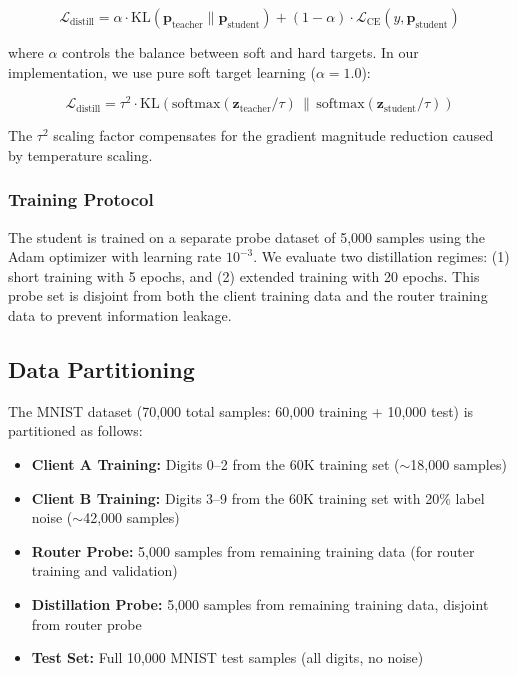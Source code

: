 \documentclass[12pt]{article}
\begin{document}
\begin{equation}
\mathcal{L}_{\text{distill}} = \alpha \cdot \text{KL}(\mathbf{p}_{\text{teacher}} \| \mathbf{p}_{\text{student}}) + (1-\alpha) \cdot \mathcal{L}_{\text{CE}}(y, \mathbf{p}_{\text{student}})
\end{equation}

where $\alpha$ controls the balance between soft and hard targets. In our implementation, we use pure soft target learning ($\alpha=1.0$):

\begin{equation}
\mathcal{L}_{\text{distill}} = \tau^2 \cdot \text{KL}\left(\text{softmax}(\mathbf{z}_{\text{teacher}}/\tau) \,\|\, \text{softmax}(\mathbf{z}_{\text{student}}/\tau)\right)
\end{equation}

The $\tau^2$ scaling factor compensates for the gradient magnitude reduction caused by temperature scaling.

\subsubsection{Training Protocol}

The student is trained on a separate probe dataset of 5,000 samples using the Adam optimizer with learning rate $10^{-3}$. We evaluate two distillation regimes: (1) short training with 5 epochs, and (2) extended training with 20 epochs. This probe set is disjoint from both the client training data and the router training data to prevent information leakage.

\subsection{Data Partitioning}
\label{subsec:data_partitioning}

The MNIST dataset (70,000 total samples: 60,000 training + 10,000 test) is partitioned as follows:

\begin{itemize}
    \item \textbf{Client A Training:} Digits 0--2 from the 60K training set ($\sim$18,000 samples)
    \item \textbf{Client B Training:} Digits 3--9 from the 60K training set with 20\% label noise ($\sim$42,000 samples)
    \item \textbf{Router Probe:} 5,000 samples from remaining training data (for router training and validation)
    \item \textbf{Distillation Probe:} 5,000 samples from remaining training data, disjoint from router probe
    \item \textbf{Test Set:} Full 10,000 MNIST test samples (all digits, no noise)
\end{itemize}
\end{document}
